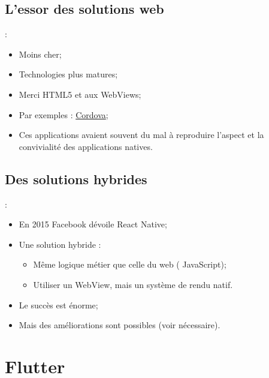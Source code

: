 \documentclass[10pt]{beamer}
\begin{document}
\subsection{L'essor des solutions web}
\begin{frame}[fragile,t]{\secname : \subsecname}
    \begin{itemize}
        \item Moins cher;
        \item Technologies plus matures;
        \item Merci HTML5 et aux WebViews;
        \item Par exemples : \href{https://cordova.apache.org}{Cordova};
        \item Ces applications avaient souvent du mal à reproduire l'aspect et la convivialité des applications natives.
    \end{itemize}
\end{frame}

\subsection{Des solutions hybrides}
\begin{frame}[fragile,t]{\secname : \subsecname}
    \begin{itemize}
        \item En 2015 Facebook dévoile React Native;
        \item Une solution hybride :
              \begin{itemize}
                  \item Même logique métier que celle du web ( JavaScript);
                  \item Utiliser un WebView, mais un système de rendu natif.
              \end{itemize}
        \item Le succès est énorme;
        \item Mais des améliorations sont possibles (voir nécessaire).
    \end{itemize}
\end{frame}


\section{Flutter}
\end{document}
